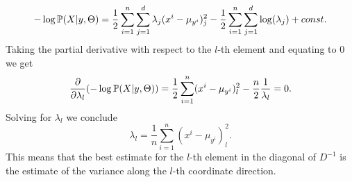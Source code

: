 \documentclass{article}
\begin{document}
\begin{equation*}
- \log \mathbb{P}(X|y,\Theta)=\frac{1}{2}\sum_{i=1}^{n}\sum_{j=1}^{d}\lambda_{j}(x^{i}-\mu_{y^{i}})^{2}_{j}-\frac{1}{2}\sum_{i=1}^{n}\sum_{j=1}^{d}\log(\lambda_{j})+const.
\end{equation*}
Taking the partial derivative with respect to the $l$-th element and equating to $0$ we get
\begin{equation*}
\frac{\partial}{\partial\lambda_{l}}(- \log \mathbb{P}(X|y,\Theta))=\frac{1}{2}\sum_{i=1}^{n}(x^{i}-\mu_{y^{i}})^{2}_{l}-\frac{n}{2}\frac{1}{\lambda_{l}}=0.
\end{equation*}
Solving for $\lambda_{l}$ we conclude
\begin{equation*}
\lambda_{l}=\frac{1}{n}\sum_{i=1}^{n}(x^{i}-\mu_{y^{i}})^{2}_{l}.
\end{equation*}
This means that the best estimate for the $l$-th element in the diagonal of $D^{-1}$ is the estimate of the variance along the $l$-th coordinate direction.
\newpage
\end{document}
